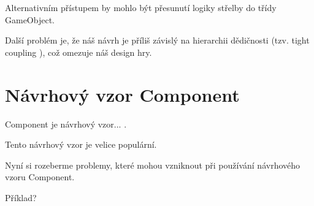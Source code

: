 Alternativním přístupem by mohlo být přesunutí logiky střelby do třídy GameObject.

Další problém je, že náš návrh je příliš závislý na hierarchii dědičnosti (tzv. tight coupling ), což omezuje náš design hry.

\section{Návrhový vzor Component}
Component je návrhový vzor... .

Tento návrhový vzor je velice populární.

Nyní si rozeberme problemy, které mohou vzniknout při používání návrhového vzoru Component.

Příklad?